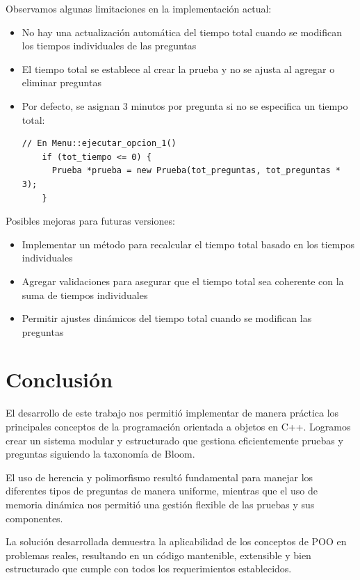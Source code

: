 \documentclass[12pt]{article}
\begin{document}
Observamos algunas limitaciones en la implementaci\'on actual:

\begin{itemize}
    \item No hay una actualizaci\'on autom\'atica del tiempo total cuando se modifican los tiempos individuales de las preguntas
    \item El tiempo total se establece al crear la prueba y no se ajusta al agregar o eliminar preguntas
    \item Por defecto, se asignan 3 minutos por pregunta si no se especifica un tiempo total:
    \begin{lstlisting}[style=customc]
    // En Menu::ejecutar_opcion_1()
    if (tot_tiempo <= 0) {
      Prueba *prueba = new Prueba(tot_preguntas, tot_preguntas * 3);
    }
    \end{lstlisting}
\end{itemize}

Posibles mejoras para futuras versiones:
\begin{itemize}
    \item Implementar un m\'etodo para recalcular el tiempo total basado en los tiempos individuales
    \item Agregar validaciones para asegurar que el tiempo total sea coherente con la suma de tiempos individuales
    \item Permitir ajustes din\'amicos del tiempo total cuando se modifican las preguntas
\end{itemize}

\section{Conclusi\'on}
El desarrollo de este trabajo nos permiti\'o implementar de manera pr\'actica los principales conceptos de la programaci\'on orientada a objetos en C++. Logramos crear un sistema modular y estructurado que gestiona eficientemente pruebas y preguntas siguiendo la taxonom\'ia de Bloom.

El uso de herencia y polimorfismo result\'o fundamental para manejar los diferentes tipos de preguntas de manera uniforme, mientras que el uso de memoria din\'amica nos permiti\'o una gesti\'on flexible de las pruebas y sus componentes.

La soluci\'on desarrollada demuestra la aplicabilidad de los conceptos de POO en problemas reales, resultando en un c\'odigo mantenible, extensible y bien estructurado que cumple con todos los requerimientos establecidos.
\end{document}
